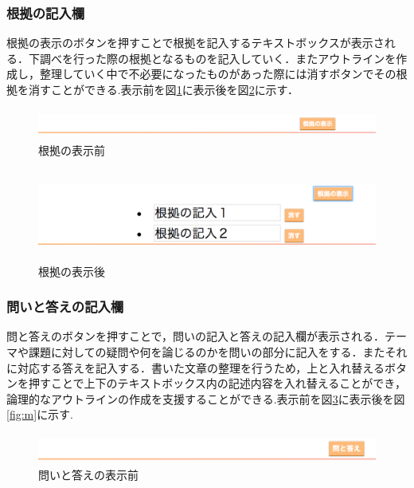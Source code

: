 \documentclass[a4j,12pt]{jarticle}
\begin{document}
\newpage
\subsubsection{根拠の記入欄}
根拠の表示のボタンを押すことで根拠を記入するテキストボックスが表示される．下調べを行った際の根拠となるものを記入していく．またアウトラインを作成し，整理していく中で不必要になったものがあった際には消すボタンでその根拠を消すことができる.表示前を図\ref{fig:j}に表示後を図\ref{fig:k}に示す．
\begin{figure}[h]
\begin{center}
 \includegraphics[clip,width=150mm,height=10mm]{figure/02konkyo.png}
\end{center}
 \caption{根拠の表示前}
 \label{fig:j}
\end{figure}

\begin{figure}[h]
\begin{center}
 \includegraphics[clip,width=150mm,height=30mm]{figure/03konkuo.png}
\end{center}
 \caption{根拠の表示後}
 \label{fig:k}
\end{figure}

\newpage
\subsubsection{問いと答えの記入欄}
問と答えのボタンを押すことで，問いの記入と答えの記入欄が表示される．テーマや課題に対しての疑問や何を論じるのかを問いの部分に記入をする．またそれに対応する答えを記入する．書いた文章の整理を行うため，上と入れ替えるボタンを押すことで上下のテキストボックス内の記述内容を入れ替えることができ，論理的なアウトラインの作成を支援することができる.表示前を図\ref{fig:l}に表示後を図\ref{fig:m}に示す.

\begin{figure}[h]
\begin{center}
 \includegraphics[clip,width=150mm,height=10mm]{figure/04qanda.png}
\end{center}
 \caption{問いと答えの表示前}
 \label{fig:l}
\end{figure}
\end{document}
